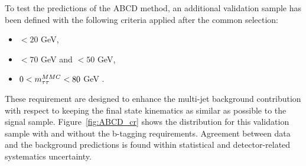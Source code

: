 To test the predictions of the ABCD method,  an additional validation sample has been defined with the following criteria applied after
the common selection:
\begin{itemize}
\item \MET $< 20$ GeV,
\item \Ht $< 70$ GeV and \SumLtMET$ < 50$ GeV,
\item $0 < m_{\tau\tau}^{MMC} < 80$ GeV  .	 
\end{itemize}
These requirement are designed to enhance the multi-jet background contribution with respect to \Ztautau keeping the final 
state kinematics as similar as possible to the signal sample.
Figure~\ref{fig:ABCD_cr} shows the \mmc distribution for this validation sample with and without the  b-tagging requirements.
Agreement between data and the background predictions is found within statistical and detector-related systematics uncertainty. 






